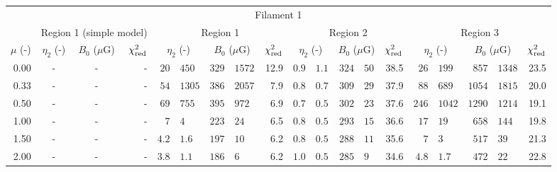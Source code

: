 \begin{tabular}{@{}r r@{ $\pm$ }lr@{ $\pm$ }lr
                     r@{ $\pm$ }lr@{ $\pm$ }lr
                     r@{ $\pm$ }lr@{ $\pm$ }lr
                     r@{ $\pm$ }lr@{ $\pm$ }lr@{}}

\toprule
\multicolumn{21}{c}{Filament 1} \\
\cmidrule{1-21}
{} & \multicolumn{5}{c}{Region 1 (simple model)}
   & \multicolumn{5}{c}{Region 1}
   & \multicolumn{5}{c}{Region 2}
   & \multicolumn{5}{c}{Region 3} \\
\cmidrule(lr){2-6} \cmidrule(lr){7-11} \cmidrule(lr){12-16} \cmidrule(l){17-21}
$\mu$ (-) & \multicolumn{2}{c}{$\eta_2$ (-)}
          & \multicolumn{2}{c}{$B_0$ ($\mu$G)} & $\chi^2_{\mathrm{red}}$
          & \multicolumn{2}{c}{$\eta_2$ (-)}
          & \multicolumn{2}{c}{$B_0$ ($\mu$G)} & $\chi^2_{\mathrm{red}}$
          & \multicolumn{2}{c}{$\eta_2$ (-)}
          & \multicolumn{2}{c}{$B_0$ ($\mu$G)} & $\chi^2_{\mathrm{red}}$
          & \multicolumn{2}{c}{$\eta_2$ (-)}
          & \multicolumn{2}{c}{$B_0$ ($\mu$G)} & $\chi^2_{\mathrm{red}}$ \\
\cmidrule{1-21}
0.00 & \multicolumn{2}{c}{-} & \multicolumn{2}{c}{-} & -
     & $20$ & $450$ & $329$ & $1572$ & 12.9
     & $0.9$ & $1.1$ & $324$ & $50$ & 38.5
     & $26$ & $199$ & $857$ & $1348$ & 23.5 \\
0.33 & \multicolumn{2}{c}{-} & \multicolumn{2}{c}{-} & -
     & $54$ & $1305$ & $386$ & $2057$ & 7.9
     & $0.8$ & $0.7$ & $309$ & $29$ & 37.9
     & $88$ & $689$ & $1054$ & $1815$ & 20.0 \\
0.50 & \multicolumn{2}{c}{-} & \multicolumn{2}{c}{-} & -
     & $69$ & $755$ & $395$ & $972$ & 6.9
     & $0.7$ & $0.5$ & $302$ & $23$ & 37.6
     & $246$ & $1042$ & $1290$ & $1214$ & 19.1 \\
1.00 & \multicolumn{2}{c}{-} & \multicolumn{2}{c}{-} & -
     & $7$ & $4$ & $223$ & $24$ & 6.5
     & $0.8$ & $0.5$ & $293$ & $15$ & 36.6
     & $17$ & $19$ & $658$ & $144$ & 19.8 \\
1.50 & \multicolumn{2}{c}{-} & \multicolumn{2}{c}{-} & -
     & $4.2$ & $1.6$ & $197$ & $10$ & 6.2
     & $0.8$ & $0.5$ & $288$ & $11$ & 35.6
     & $7$ & $3$ & $517$ & $39$ & 21.3 \\
2.00 & \multicolumn{2}{c}{-} & \multicolumn{2}{c}{-} & -
     & $3.8$ & $1.1$ & $186$ & $6$ & 6.2
     & $1.0$ & $0.5$ & $285$ & $9$ & 34.6
     & $4.8$ & $1.7$ & $472$ & $22$ & 22.8 \\


\end{tabular}
